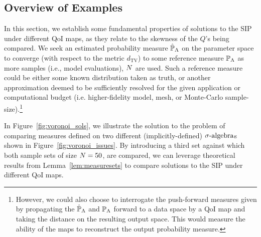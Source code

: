 \subsection{Overview of Examples}
In this section, we establish some fundamental properties of solutions to the SIP under different QoI maps, as they relate to the skewness of the $Q$'s being compared.
We seek an estimated probability measure $\hat{\mathbb{P}}_{\Lambda}$ on the parameter space to converge (with respect to the metric $d_\text{TV}$) to some reference measure $\mathbb{P}_{\Lambda}$ as more samples (i.e., model evaluations), $N$ are used.
Such a reference measure could be either some known distribution taken as truth, or another approximation deemed to be sufficiently resolved for the given application or computational budget (i.e. higher-fidelity model, mesh, or Monte-Carlo sample-size).\footnote{However, we could also choose to interrogate the push-forward measures given by propagating the $\hat{\mathbb{P}}_{\Lambda}$ and $\mathbb{P}_{\Lambda}$ forward to a data space by a QoI map and taking the distance on the resulting output space.
This would measure the ability of the maps to reconstruct the output probability measure.}

In Figure~\ref{fig:voronoi_sols}, we illustrate the solution to the problem of comparing measures defined on two different (implicitly-defined) $\sigma\text{-algebra}$s shown in Figure~\ref{fig:voronoi_issues}.
By introducing a third set against which both sample sets of size $N=50$, are compared, we can leverage theoretical results from Lemma~\ref{lem:measuresets} to compare solutions to the SIP under different QoI maps.

